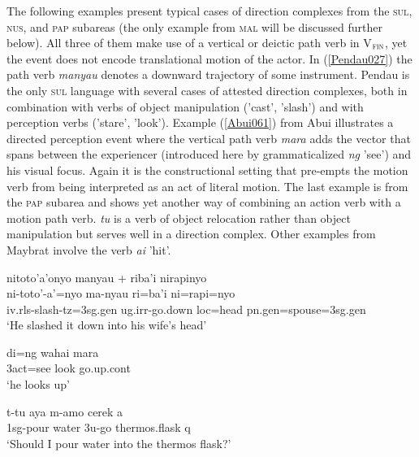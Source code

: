 The following examples present typical cases of direction complexes from the \textsc{sul}, \textsc{nus}, and \textsc{pap} subareas (the only example from \textsc{mal} will be discussed further below). All three of them make use of a vertical or deictic path verb in V$_{\textsc{fin}}$, yet the event does not encode translational motion of the actor. In (\ref{Pendau027}) the path verb \textit{manyau} denotes a downward trajectory of some instrument. Pendau is the only \textsc{sul} language with several cases of attested direction complexes, both in combination with verbs of object manipulation ('cast', 'slash') and with perception verbs ('stare', 'look'). Example (\ref{Abui061}) from Abui illustrates a directed perception event where the vertical path verb \textit{mara} adds the vector that spans between the experiencer (introduced here by grammaticalized \textit{ng} 'see') and his visual focus. Again it is the constructional setting that pre-empts the motion verb from being interpreted as an act of literal motion. The last example is from the \textsc{pap} subarea and shows yet another way of combining an action verb with a motion path verb. \textit{tu} is a verb of object relocation rather than object manipulation but serves well in a direction complex. Other examples from Maybrat involve the verb \textit{ai} 'hit'.

\ea \label{Pendau027}
\gll nitoto'a'onyo manyau + riba'i nirapinyo \\
ni-toto'-a'=nyo ma-nyau ri=ba'i ni=rapi=nyo \\
\glc \acs{iv}.\acs{rls}-slash-\acs{tz}=\acs{3}\acs{sg}.\acs{gen} \acs{ug}.\acs{irr}-go.down \acs{loc}=head \acs{pn}.\acs{gen}=spouse=\acs{3}\acs{sg}.\acs{gen} \\
\glft `He slashed it down into his wife's head' \\ 
\z
\xe

\ea \label{Abui061}
\gll di=ng wahai mara \\
\acs{3}\acs{act}=see look go.up.\acs{cont} \\
\glft ‘he looks up’ \\ 
\z
\xe

\ea \label{Maybrat102}
\gll t-tu aya m-amo cerek a \\
\acs{1}\acs{sg}-pour water \acs{3}\acs{u}-go thermos.flask \acs{q} \\
\glft `Should I pour water into the thermos flask?' \\ 
\z
\xe


